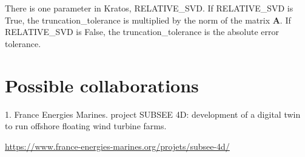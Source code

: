 \documentclass{article}
\begin{document}
There is one parameter in Kratos, RELATIVE\_SVD. If RELATIVE\_SVD is True, the truncation\_tolerance is multiplied by the norm of the matrix $\bm{A}$. If RELATIVE\_SVD is False, the truncation\_tolerance is the absolute error tolerance. 

\section{Possible collaborations}

1. France Energies Marines. project SUBSEE 4D: development of a digital twin to run offshore floating wind turbine farms. \newline

\url{https://www.france-energies-marines.org/projets/subsee-4d/}\newline




\end{document}
